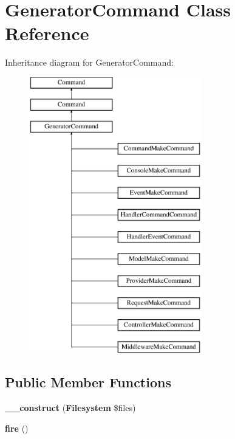 \section{Generator\+Command Class Reference}
\label{class_illuminate_1_1_console_1_1_generator_command}
Inheritance diagram for Generator\+Command\+:\begin{figure}[H]
\begin{center}
\leavevmode
\includegraphics[height=12.000000cm]{class_illuminate_1_1_console_1_1_generator_command}
\end{center}
\end{figure}
\subsection*{Public Member Functions}
\begin{DoxyCompactItemize}
\item 
{\bf \+\_\+\+\_\+construct} ({\bf Filesystem} \$files)
\item 
{\bf fire} ()
\end{DoxyCompactItemize}
